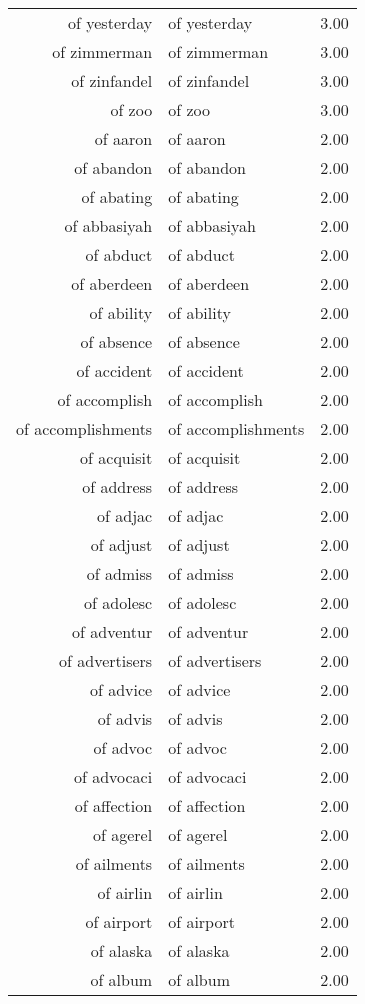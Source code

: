 \begin{table}[ht]
\begin{tabular}{rlr}
  of yesterday & of yesterday & 3.00 \\ 
  of zimmerman & of zimmerman & 3.00 \\ 
  of zinfandel & of zinfandel & 3.00 \\ 
  of zoo & of zoo & 3.00 \\ 
  of aaron & of aaron & 2.00 \\ 
  of abandon & of abandon & 2.00 \\ 
  of abating & of abating & 2.00 \\ 
  of abbasiyah & of abbasiyah & 2.00 \\ 
  of abduct & of abduct & 2.00 \\ 
  of aberdeen & of aberdeen & 2.00 \\ 
  of ability & of ability & 2.00 \\ 
  of absence & of absence & 2.00 \\ 
  of accident & of accident & 2.00 \\ 
  of accomplish & of accomplish & 2.00 \\ 
  of accomplishments & of accomplishments & 2.00 \\ 
  of acquisit & of acquisit & 2.00 \\ 
  of address & of address & 2.00 \\ 
  of adjac & of adjac & 2.00 \\ 
  of adjust & of adjust & 2.00 \\ 
  of admiss & of admiss & 2.00 \\ 
  of adolesc & of adolesc & 2.00 \\ 
  of adventur & of adventur & 2.00 \\ 
  of advertisers & of advertisers & 2.00 \\ 
  of advice & of advice & 2.00 \\ 
  of advis & of advis & 2.00 \\ 
  of advoc & of advoc & 2.00 \\ 
  of advocaci & of advocaci & 2.00 \\ 
  of affection & of affection & 2.00 \\ 
  of agerel & of agerel & 2.00 \\ 
  of ailments & of ailments & 2.00 \\ 
  of airlin & of airlin & 2.00 \\ 
  of airport & of airport & 2.00 \\ 
  of alaska & of alaska & 2.00 \\ 
  of album & of album & 2.00 \\ 

\end{tabular}
\end{table}
